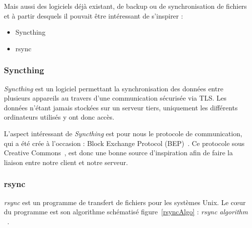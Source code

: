 \documentclass[a4paper,10pt, twoside]{report}
\begin{document}
\begin{spacing}{1.2}
Mais aussi des logiciels d\'ej\`a existant, de backup ou de synchronisation de
fichiers et \`a partir desquels il pouvait \^etre int\'eressant de s'inspirer :
\begin{itemize}
 \item Syncthing~\cite{refSyncthing}
 \item rsync~\cite{refRsync}
\end{itemize}

\subsubsection{Syncthing}
\textit{Syncthing} est un logiciel permettant la synchronisation des donn\'ees
entre plusieurs appareils au travers d'une communication s\'ecuris\'ee via TLS.
Les donn\'ees n'\'etant jamais stock\'ees sur un serveur tiers, uniquement les
diff\'erents ordinateurs utilis\'es y ont donc acc\`es.

L'aspect int\'eressant de \textit{Syncthing} est pour nous le protocole de
communication, qui a \'et\'e cr\'ee \`a l'occasion : Block Exchange Protocol
(BEP)~\cite{refBEP}. Ce protocole sous Creative Commons~\cite{refCC4.0}, est
donc une bonne source d'inspiration afin de faire la liaison entre notre client
et notre serveur.

\subsubsection{rsync}
\textit{rsync} est un programme de transfert de fichiers pour les syst\`emes
Unix. Le c\oe ur du programme est son algorithme sch\'ematis\'e
figure~\ref{rsyncAlgo} :
\textit{\flqq rsync algorithm \frqq}~\cite{refRsyncAlgo}.


\end{spacing}
\end{document}
